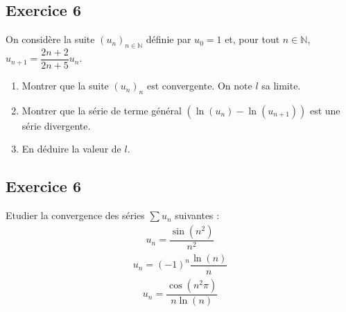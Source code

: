 \documentclass[letterpaper,10pt,french]{sphinxmanual}
\begin{document}
\subsection{Exercice 6}
\label{\detokenize{exo4:exercice-6}}
\sphinxAtStartPar
On considère la suite \((u_n)_{n\in \mathbb N}\) définie par \(u_0=1\) et, pour tout \(n\in \mathbb N\), \(u_{n+1} =\dfrac{2n+2}{2n+5}u_n\).
\begin{enumerate}
%
\item {} 
\sphinxAtStartPar
Montrer que la suite \((u_n)_n\) est convergente. On note \(l\) sa limite.

\item {} 
\sphinxAtStartPar
Montrer que la série de terme général \((\ln(u_n)- \ln(u_{n+1}))\) est une série divergente.

\item {} 
\sphinxAtStartPar
En déduire la valeur de \(l\).

\end{enumerate}


\subsection{Exercice 6}
\label{\detokenize{exo4:id1}}
\sphinxAtStartPar
Etudier la convergence des séries \(\sum u_n\) suivantes :
\begin{equation*}
\begin{split}
u_n = \dfrac{\sin (n^2)}{n^2}
\end{split}
\end{equation*}\begin{equation*}
\begin{split}
u_n =(-1)^n \dfrac{\ln (n)}{n}
\end{split}
\end{equation*}\begin{equation*}
\begin{split}
u_n =\dfrac{\cos (n^2\pi)}{n\ln (n)}
\end{split}
\end{equation*}






\renewcommand{\indexname}{Index}
\printindex
\end{document}
